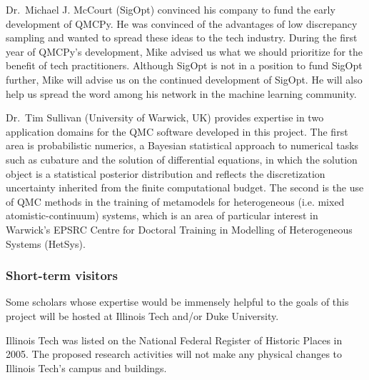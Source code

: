 \documentclass[11pt]{NSFamsart}
\begin{document}
Dr.\ Michael J. McCourt (SigOpt) convinced his company to fund the early development of QMCPy.  He was convinced of the advantages of low discrepancy sampling and wanted to spread these ideas to the tech industry.  During the first year of QMCPy's development, Mike advised us what we should prioritize for the benefit of tech practitioners.  Although SigOpt is not in a position to  fund SigOpt further, Mike will advise us on the continued development of SigOpt.  He will also help us spread the word among his network in the machine learning community.

Dr.\ Tim Sullivan (University of Warwick, UK) provides expertise in two application domains for the QMC software developed in this project.  The first area is probabilistic numerics, a Bayesian statistical approach to numerical tasks such as cubature and the solution of differential equations, in which the solution object is a statistical posterior distribution and reflects the discretization uncertainty inherited from the finite computational budget.  The second  is the use of QMC methods in the training of metamodels for heterogeneous (i.e. mixed atomistic-continuum) systems, which is an area of particular interest in Warwick's EPSRC Centre for Doctoral Training in Modelling of Heterogeneous Systems (HetSys).


\subsubsection*{Short-term visitors} Some scholars whose expertise would be immensely helpful to the goals of this project will be hosted at Illinois Tech and/or Duke University.

\bigskip \bigskip

Illinois Tech was listed on the National Federal Register of Historic Places in 2005. The proposed 
research activities will not make any physical changes to Illinois Tech's campus and buildings.
\end{document}
